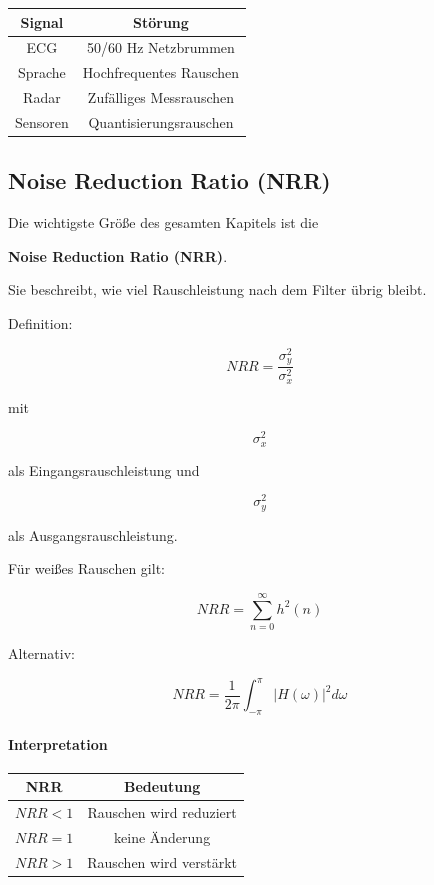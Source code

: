 \begin{table}[h]
\centering
\begin{tabular}{c|c}
Signal & Störung \\
\hline
ECG & 50/60 Hz Netzbrummen \\
Sprache & Hochfrequentes Rauschen \\
Radar & Zufälliges Messrauschen \\
Sensoren & Quantisierungsrauschen \\
\end{tabular}
\end{table}

\subsection{Noise Reduction Ratio (NRR)}

Die wichtigste Größe des gesamten Kapitels ist die

\textbf{Noise Reduction Ratio (NRR)}.

Sie beschreibt, wie viel Rauschleistung nach dem Filter übrig bleibt.

Definition:

\[
NRR=
\frac{\sigma_y^2}
{\sigma_x^2}
\]

mit

\[
\sigma_x^2
\]

als Eingangsrauschleistung und

\[
\sigma_y^2
\]

als Ausgangsrauschleistung.

Für weißes Rauschen gilt:

\[
NRR=
\sum_{n=0}^{\infty} h^2(n)
\]

Alternativ:

\[
NRR=
\frac{1}{2\pi}
\int_{-\pi}^{\pi}
|H(\omega)|^2 d\omega
\]

\paragraph{Interpretation}

\begin{table}[h]
\centering
\begin{tabular}{c|c}
NRR & Bedeutung \\
\hline
$NRR<1$ & Rauschen wird reduziert \\
$NRR=1$ & keine Änderung \\
$NRR>1$ & Rauschen wird verstärkt \\
\end{tabular}
\end{table}

